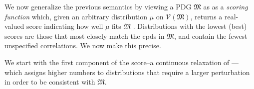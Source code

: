 \documentclass{article}
\theoremstyle{plain}
\theoremstyle{definition}
\theoremstyle{remark}
\newcommand{\V}{\mathcal V}
\newcommand{\dg}[1]{\mathfrak{#1}}
\numberwithin{equation}{section}
\begin{document}
	We now generalize the previous semantics by viewing a PDG $\dg M$ as
	as a \emph{scoring function} which, given an arbitrary distribution $\mu$ on $\V(\dg M)$,
	returns a real-valued score indicating how well $\mu$ fits $\dg M$%
	. Distributions with the lowest (best) scores are those that
	most closely match the cpds in $\dg M$, and contain the fewest unspecified correlations.
	We now make this precise.

	We start with the first component of the score--a continuous relaxation of ---which assigns higher numbers to distributions that require a larger perturbation in order to be consistent with $\dg M$. 
%
\end{document}
